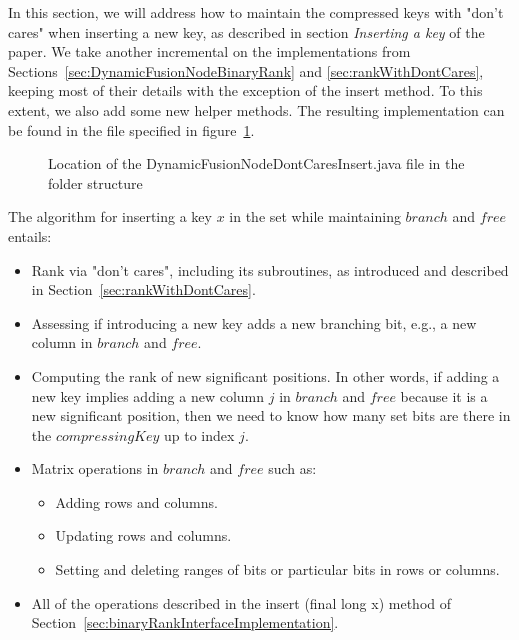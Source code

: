 In this section, we will address how to maintain the compressed keys with "don't cares" when inserting a new key, as described in section \textit{Inserting a key} of the \cite{patrascu2014dynamic} paper.
We take another incremental on the implementations from Sections~\ref{sec:DynamicFusionNodeBinaryRank} and \ref{sec:rankWithDontCares}, keeping most of their details with the exception of the {\ttfamily insert} method.
To this extent, we also add some new helper methods.
The resulting implementation can be found in the file specified in figure~\ref{fig:DynamicFusionNodeDontCaresInsertTree}.
\begin{figure}[H]
\caption{Location of the {\ttfamily DynamicFusionNodeDontCaresInsert.java} file in the folder structure}
\label{fig:DynamicFusionNodeDontCaresInsertTree}
\end{figure}

The algorithm for inserting a key $x$ in the set while maintaining $branch$ and $free$ entails:
\begin{itemize}
    \item
    Rank via "don't cares", including its subroutines, as introduced and described in Section~\ref{sec:rankWithDontCares}.
    
    \item
    Assessing if introducing a new key adds a new branching bit, e.g., a new column in $branch$ and $free$.
    
    \item
    Computing the rank of new significant positions. In other words, if adding a new key implies adding a new column $j$ in $branch$ and $free$ because it is a new significant position, then we need to know how many set bits are there in the $compressingKey$ up to index $j$.
    
    \item
    Matrix operations in $branch$ and $free$ such as:
    \begin{itemize}
        \item
        Adding rows and columns.
        
        \item
        Updating rows and columns.
        
        \item
        Setting and deleting ranges of bits or particular bits in rows or columns.
    \end{itemize}
    
    \item
    All of the operations described in the {\ttfamily insert (final long x)} method of Section~\ref{sec:binaryRankInterfaceImplementation}.
\end{itemize}

